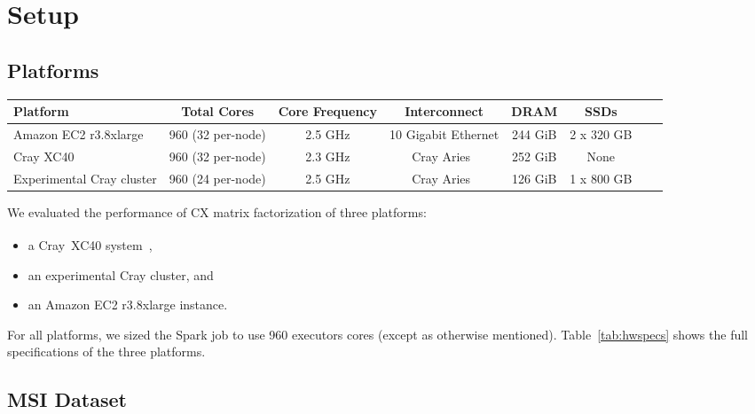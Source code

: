 \section{Setup}
\label{sec:setup}

\subsection{Platforms}

  \begin{table*}
    \begin{center}
    \begin{tabular}{| l | c | c | c | c | c | c | c |}
    \toprule
    \textbf{Platform} & \textbf{Total Cores} & \textbf{Core Frequency} & \textbf{Interconnect} & \textbf{DRAM} & \textbf{SSDs} \\
    \midrule
    Amazon EC2 r3.8xlarge & 960 (32 per-node) & 2.5 GHz & 10 Gigabit Ethernet & 244 GiB & 2 x 320 GB \\
    \midrule
    Cray XC40 & 960 (32 per-node) & 2.3 GHz & Cray Aries~\cite{alverson2012cray,craycascadesc12} & 252 GiB & None \\
    \midrule
    Experimental Cray cluster & 960 (24 per-node) & 2.5 GHz & Cray Aries~\cite{alverson2012cray,craycascadesc12} & 126 GiB & 1 x 800 GB \\
    \bottomrule
    \end{tabular}
    \end{center}
    \caption{Specifications of the three hardware platforms used in these performance experiments.}
    \label{tab:hwspecs}
  \end{table*}
  
 We evaluated the performance of CX matrix factorization of three platforms:
 \begin{itemize}
 \item a Cray\textregistered~XC40\textsuperscript{\tiny\texttrademark} 
 system~\cite{alverson2012cray,craycascadesc12},
 \item an experimental Cray cluster, and
 \item an Amazon EC2 r3.8xlarge instance.
 \end{itemize}
 For all platforms, we sized the Spark job to use 960 executors cores (except as otherwise mentioned).  Table~\ref{tab:hwspecs} shows the full specifications of the three platforms.
  
\subsection{MSI Dataset}
